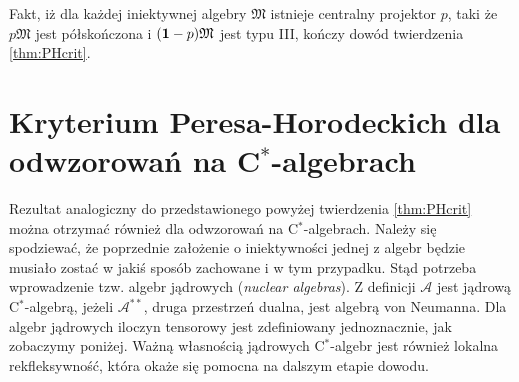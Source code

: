 Fakt, iż dla każdej iniektywnej algebry $\mathfrak{M}$
istnieje centralny projektor $p$, taki że $p\mathfrak{M}$
jest półskończona i $({\bf 1}-p)\mathfrak{M}$ jest typu III,
kończy dowód twierdzenia \ref{thm:PHcrit}.


\section{Kryterium Peresa-Horodeckich dla odwzorowań na C$^*$-algebrach}

Rezultat analogiczny do przedstawionego powyżej twierdzenia \ref{thm:PHcrit}
można otrzymać również dla odwzorowań na C$^*$-algebrach.
Należy się spodziewać, że poprzednie założenie o iniektywności jednej z
algebr będzie musiało zostać w jakiś sposób zachowane i w tym przypadku.
Stąd potrzeba wprowadzenie tzw. algebr jądrowych (\emph{nuclear algebras}).
Z definicji $\mathcal{A}$ jest jądrową C$^{*}$-algebrą,
jeżeli $\mathcal{A}^{**}$, druga przestrzeń dualna,
jest algebrą von Neumanna.
Dla algebr jądrowych iloczyn tensorowy jest zdefiniowany jednoznacznie,
jak zobaczymy poniżej.
Ważną własnością jądrowych C$^{*}$-algebr jest również lokalna rekfleksywność,
która okaże się pomocna na dalszym etapie dowodu.

